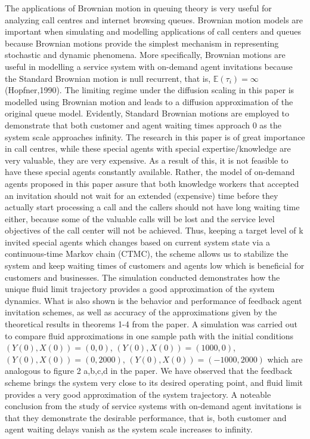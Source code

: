The applications of Brownian motion in queuing theory is very useful for analyzing call centres and internet browsing queues. Brownian motion models are important when simulating and modelling applications of call centers and queues because Brownian motions provide the simplest mechanism in representing stochastic and dynamic phenomena. More specifically, Brownian motions are useful in modelling a service system with on-demand agent invitations because the Standard Brownian motion is null recurrent, that is, $ \mathbb{E}(\tau_i) = \infty$ (Hopfner,1990). The limiting regime under the diffusion scaling in this paper is modelled using Brownian motion and leads to a diffusion approximation of the original queue model. Evidently, Standard Brownian motions are employed to demonstrate that both customer and agent waiting times approach 0 as the system scale approaches infinity. The research in this paper is of great importance in call centres, while these special agents with special expertise/knowledge are very valuable, they are very expensive. As a result of this, it is not feasible to have these special agents constantly available. Rather, the model of on-demand agents proposed in this paper assure that both knowledge workers that accepted an invitation should not wait for an extended (expensive) time before they actually start processing a call and the callers should not have long waiting time either, because some of the valuable calls will be lost and the service level objectives of the call center will not be achieved. Thus, keeping a target level of k invited special agents which changes based on current system state via a continuous-time Markov chain (CTMC), the scheme allows us to stabilize the system and keep waiting times of customers and agents low which is beneficial for customers and businesses.\newline\newline
The simulation conducted demonstrates how the unique fluid limit trajectory provides a good approximation of the system dynamics. What is also shown is the behavior and performance of feedback agent invitation schemes, as well as accuracy of the approximations given by the theoretical results in theorems 1-4 from the paper. A simulation was carried out to compare fluid approximations in one sample path with the initial conditions $(Y(0),X(0))=(0,0)$,  $(Y(0),X(0))=(1000,0)$,  $(Y(0),X(0))=(0,2000)$,  $(Y(0),X(0))=(-1000,2000)$ which are analogous to figure 2 a,b,c,d in the paper. We have observed that the feedback scheme brings the system very close to its desired operating point, and fluid limit provides a very good approximation of the system trajectory. A noteable conclusion from the study of service systems with on-demand agent invitations is that they demonstrate the desirable performance, that is, both customer and agent waiting delays vanish as the system scale increases to infinity.

